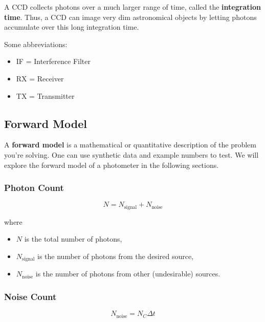 \vsp

A CCD collects photons over a much larger range of time, called the \textbf{integration time}. Thus, a CCD can image very dim astronomical objects by letting photons accumulate over this long integration time.

\vsp

Some abbreviations:
\begin{itemize}
    \item IF = Interference Filter
    \item RX = Receiver
    \item TX = Transmitter
\end{itemize}

\subsection{Forward Model}

A \textbf{forward model} is a mathematical or quantitative description of the problem you're solving. One can use synthetic data and example numbers to test. We will explore the forward model of a photometer in the following sections.

\subsubsection{Photon Count}

\begin{equation*}
    N = N_{\text{signal}} + N_{\text{noise}}
\end{equation*}

where

\begin{itemize}
    \item $N$ is the total number of photons,
    \item $N_{\text{signal}}$ is the number of photons from the desired source,
    \item $N_{\text{noise}}$ is the number of photons from other (undesirable) sources.
\end{itemize}

\subsubsection{Noise Count}

\begin{equation*}
    N_{\text{noise}} = N_C \Delta t
\end{equation*}

